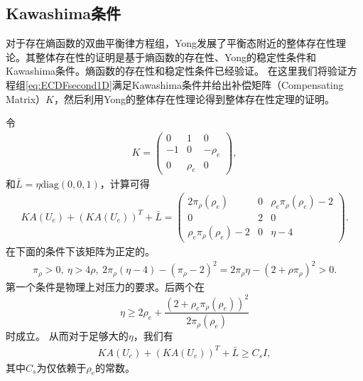 \subsection{Kawashima条件}
对于存在熵函数的双曲平衡律方程组，Yong发展了平衡态附近的整体存在性理论\cite{yong2004entropy,hanouzet2003global}。其整体存在性的证明是基于熵函数的存在性、Yong的稳定性条件和Kawashima条件。熵函数的存在性和稳定性条件已经验证。%
在这里我们将验证方程组\eqref{eq:ECDFsecond1D}满足Kawashima条件并给出补偿矩阵（Compensating Matrix）$K$\cite{kawashima1985systems}，然后利用Yong的整体存在性理论\cite{yong2004entropy}得到整体存在性定理的证明。

令
\begin{eqnarray}\label{33}
K=\left( \begin{array}{ccc}
	0 & 1 & 0 \\
	-1 & 0 & -\rho_e \\
	0 & \rho_e & 0
	\end{array} \right),
\end{eqnarray}
和$\bar{L} = \eta\mbox{diag}(0, 0, 1)$，计算可得
\begin{eqnarray*}
K A(U_e) + (K A(U_e))^T + \bar{L} =
	\left( \begin{array}{ccc}
	2 \pi_\rho(\rho_e) & 0 & \rho_e \pi_\rho(\rho_e) -2  \\
	0 & 2 & 0 \\
	\rho_e \pi_\rho(\rho_e) - 2 & 0 & \eta -4 	
	\end{array} \right).
\end{eqnarray*}
在下面的条件下该矩阵为正定的。
\begin{eqnarray*}
\pi_\rho  > 0, \ \eta > 4 \rho, \ 2\pi_\rho(\eta - 4)-(\pi_{\rho}-2)^2 = 2 \pi_\rho \eta  - (2 +  \rho \pi_\rho)^2 >0.
\end{eqnarray*}
第一个条件是物理上对压力的要求。后两个在
$$
\eta \ge 2 \rho_e +\frac{(2 + \rho_e \pi_\rho(\rho_e))^2}{2 \pi_\rho(\rho_e)}
$$
时成立。
从而对于足够大的$\eta$，我们有
\begin{eqnarray}\label{35}
K A(U_e) + (K A(U_e))^T + \bar{L} \ge C_s I,
\end{eqnarray}
其中$C_s$为仅依赖于$\rho_e$的常数。

